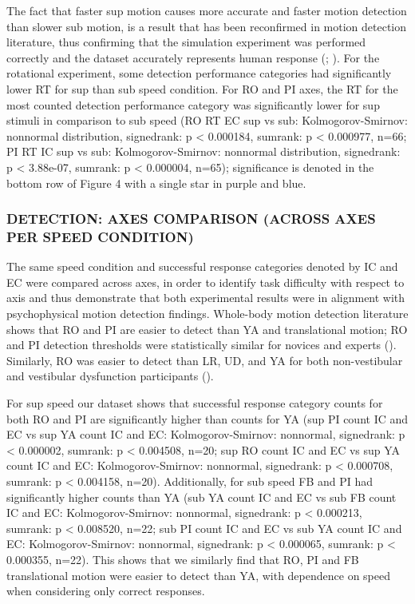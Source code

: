 \documentclass[11pt, onecolumn]{article}
\begin{document}
The fact that faster sup motion causes more accurate and faster motion detection than slower sub motion, is a result that has been reconfirmed in motion detection literature, thus confirming that the simulation experiment was performed correctly and the dataset accurately represents human response (\cite{Valko_2012_Vestibular}; \cite{Hartmann_2014_Direction}).  For the rotational experiment, some detection performance categories had significantly lower RT for sup than sub speed condition. For RO and PI axes, the RT for the most counted detection performance category was significantly lower for sup stimuli in comparison to sub speed (RO RT EC sup vs sub: Kolmogorov-Smirnov: nonnormal distribution, signedrank: p < 0.000184, sumrank: p < 0.000977, n=66; PI RT IC  sup vs sub: Kolmogorov-Smirnov: nonnormal distribution, signedrank: p < 3.88e-07, sumrank: p <  0.000004, n=65); significance is denoted in the bottom row of Figure 4 with a single star in purple and blue.

\subsubsection{DETECTION: AXES COMPARISON (ACROSS AXES PER SPEED CONDITION)}

The same speed condition and successful response categories denoted by IC and EC were compared across axes, in order to identify task difficulty with respect to axis and thus demonstrate that both experimental results were in alignment with psychophysical motion detection findings.  Whole-body motion detection literature shows that RO and PI are easier to detect than YA and translational motion; RO and PI detection thresholds were statistically similar for novices and experts (\cite{Hartmann_2014_Direction}).  Similarly, RO was easier to detect than LR, UD, and YA for both non-vestibular and vestibular dysfunction participants (\cite{Valko_2012_Vestibular}). 

For sup speed our dataset shows that successful response category counts for both RO and PI are significantly higher than counts for YA (sup PI count IC and EC vs sup YA count IC and EC: Kolmogorov-Smirnov: nonnormal, signedrank: p < 0.000002, sumrank: p < 0.004508, n=20; sup RO count IC and EC vs sup YA count IC and EC: Kolmogorov-Smirnov: nonnormal, signedrank: p < 0.000708, sumrank: p < 0.004158, n=20).  Additionally, for sub speed FB and PI had significantly higher counts than YA (sub YA count IC and EC vs sub FB count IC and EC: Kolmogorov-Smirnov: nonnormal, signedrank: p < 0.000213, sumrank: p < 0.008520, n=22; sub PI count IC and EC vs sub YA count IC and EC: Kolmogorov-Smirnov: nonnormal, signedrank: p < 0.000065, sumrank: p < 0.000355, n=22).  This shows that we similarly find that RO, PI and FB translational motion were easier to detect than YA, with dependence on speed when considering only correct responses.
\end{document}
